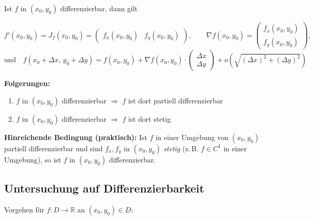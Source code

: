 \documentclass[a4paper,11pt,oneside,open=any,parskip=half, DIV=15]{scrreprt}
\begin{document}
      Ist \(f\) in \((x_0,y_0)\) differenzierbar, dann gilt
      \begin{importantbox}
      \[
         f'(x_0,y_0)=J_f(x_0,y_0)=\begin{pmatrix} f_x(x_0,y_0) & f_y(x_0,y_0) \end{pmatrix},
         \qquad
         \nabla f(x_0,y_0)=\begin{pmatrix} f_x(x_0,y_0)\\[0.2em] f_y(x_0,y_0) \end{pmatrix},
      \]
      \[
         \text{und}\quad
         f(x_0+\Delta x,\,y_0+\Delta y)
         = f(x_0,y_0) + \nabla f(x_0,y_0)\!\cdot\!
            \begin{pmatrix}\Delta x\\ \Delta y\end{pmatrix}
            + o\!\left(\sqrt{(\Delta x)^2+(\Delta y)^2}\right)
      \]
      \end{importantbox}

      \textbf{Folgerungen:}
      \begin{enumerate}[label=(\arabic*)]
         \item \(f\) in \((x_0,y_0)\) differenzierbar \(\Rightarrow\) \(f\) ist dort partiell differenzierbar
         \item \(f\) in \((x_0,y_0)\) differenzierbar \(\Rightarrow\) \(f\) ist dort stetig
      \end{enumerate}

      \textbf{Hinreichende Bedingung (praktisch):}
      Ist \(f\) in einer Umgebung von \((x_0,y_0)\) partiell differenzierbar und sind
      \(f_x, f_y\) in \((x_0,y_0)\) \emph{stetig} (z.\,B. \(f\in C^1\) in einer Umgebung),
      so ist \(f\) in \((x_0,y_0)\) differenzierbar.

\newpage       

   \subsection*{Untersuchung auf Differenzierbarkeit}

      Vorgehen für \(f:D\to\mathbb{R}\) an \((x_0,y_0)\in D\):
\end{document}
